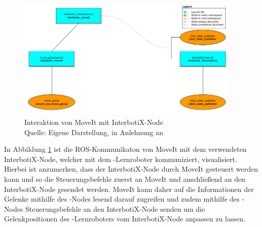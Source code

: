 \begin{figure}[htb]
	\centering
	\includegraphics[width=0.95\textwidth]{images/loesungsweg/moveit_flowchart}
	\caption[Interaktion von MoveIt mit InterbotiX-Node]{Interaktion von MoveIt mit InterbotiX-Node\\Quelle: Eigene Darstellung, in Anlehnung an \cite{interbotixinterbotix_ros_arms_github_image_nodate}}
	\label{fig:interbotixinterbotix_ros_arms_github_image_nodate}
\end{figure}
\FloatBarrier

In Abbildung \ref{fig:interbotixinterbotix_ros_arms_github_image_nodate} ist die ROS-Kommunikaton von MoveIt mit dem verwendeten InterbotiX-Node, welcher mit dem -Lernroboter kommuniziert, visualisiert. Hierbei ist anzumerken, dass der InterbotiX-Node durch MoveIt gesteuert werden kann und so die Steuerungsbefehle zuerst an MoveIt und anschließend an den InterbotiX-Node gesendet werden. MoveIt kann daher auf die Informationen der Gelenke mithilfe des -Nodes lesend darauf zugreifen und zudem mithilfe des -Nodes Steuerungsbefehle an den InterbotiX-Node senden um die Gelenkpositionen des -Lernroboters vom InterbotiX-Node anpassen zu lassen.

